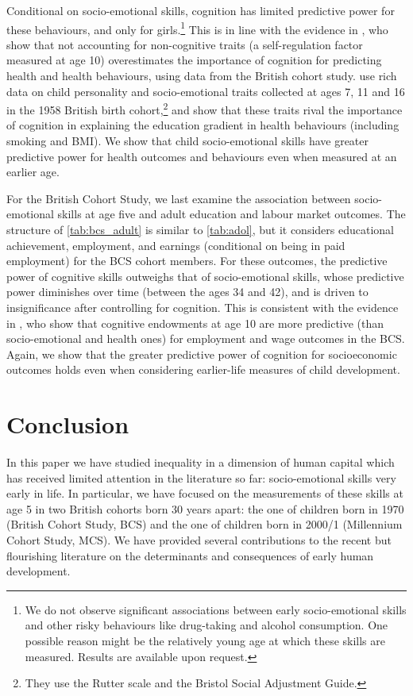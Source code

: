 Conditional on socio-emotional skills, cognition has limited predictive power for these behaviours, and only for girls.\footnote{We do not observe significant associations between early socio-emotional skills and other risky behaviours like drug-taking and alcohol consumption. One possible reason might be the relatively young age at which these skills are measured. Results are available upon request.} This is in line with the evidence in \citet{Conti2010}, who show that not accounting for non-cognitive traits (a self-regulation factor measured at age 10) overestimates the importance of cognition for predicting health and health behaviours, using data from the British cohort study. \citet{Conti2013a} use rich data on child personality and socio-emotional traits collected at ages 7, 11 and 16 in the 1958 British birth cohort,\footnote{They use the Rutter scale and the Bristol Social Adjustment Guide.} and show that these traits rival the importance of cognition in explaining the education gradient in health behaviours (including smoking and BMI). We show that child socio-emotional skills have greater predictive power for health outcomes and behaviours even when measured at an earlier age.

For the British Cohort Study, we last examine the association between socio-emotional skills at age five and adult education and labour market outcomes. The structure of \autoref{tab:bcs_adult} is similar to \autoref{tab:adol}, but it considers educational achievement, employment, and earnings (conditional on being in paid employment) for the BCS cohort members. For these outcomes, the predictive power of cognitive skills outweighs that of socio-emotional skills, whose predictive power diminishes over time (between the ages 34 and 42), and is driven to insignificance after controlling for cognition. This is consistent with the evidence in \citet{Conti2011}, who show that cognitive endowments at age 10 are more predictive (than socio-emotional and health ones) for employment and wage outcomes in the BCS. Again, we show that the greater predictive power of cognition for socioeconomic outcomes holds even when considering earlier-life measures of child development.

\section{Conclusion}\label{sec:conclusions}

In this paper we have studied inequality in a dimension of human capital which has received limited attention in the literature so far: socio-emotional skills very early in life. In particular, we have focused on the measurements of these skills at age 5 in two British cohorts born 30 years apart: the one of children born in 1970 (British Cohort Study, BCS) and the one of children born in 2000/1 (Millennium Cohort Study, MCS). We have provided several contributions to the recent but flourishing literature on the determinants and consequences of early human development.

